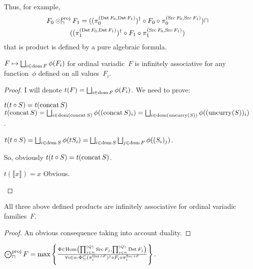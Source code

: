 \begin{rem}
  Thus, for example,
\begin{multline*}
  F_0 \odot^{\text{proj}}_{\sqcap} F_1 = ((\pi^{(\operatorname{Dst} F_0 , \operatorname{Dst}
  F_1)}_0)^{\dagger} \circ F_0 \circ \pi^{(\operatorname{Src} F_0 , \operatorname{Src}
  F_1)}_0) \sqcap\\ ((\pi^{(\operatorname{Dst} F_0 , \operatorname{Dst} F_1)}_1)^{\dagger}
  \circ F_1 \circ \pi^{(\operatorname{Src} F_0 , \operatorname{Src} F_1)}_1)
\end{multline*}
  that is product is defined by a pure algebraic formula.
\end{rem}

\begin{lem}
$F\mapsto\bigsqcup_{i\in\dom F}\phi(F_i)$ for ordinal variadic~$F$ is infinitely
associative for any function~$\phi$ defined on all values~$F_i$.
\end{lem}

\begin{proof}
I will denote $t(F)=\bigsqcup_{i\in\dom F}\phi(F_i)$. We need
to prove:
\begin{widedisorder}
\item[$t(t\circ S)=t(\operatorname{concat} S)$]
$t(\concat S)=
\bigsqcup_{i\in\dom(\concat S)}\phi((\concat S)_i)=
\bigsqcup_{i\in\dom(\uncurry(S))}\phi((\uncurry(S))_i)$.

$t(t\circ S)=
\bigsqcup_{i\in\dom S}\phi(tS_i)=
\bigsqcup_{i\in\dom S}\bigsqcup_{j\in\dom F}\phi((S_i)_j)$.

So, obviously $t(t\circ S)=t(\operatorname{concat} S)$.

\item[$t(\llbracket x\rrbracket)=x$] Obvious.
\end{widedisorder}
\end{proof}

\begin{cor}
All three above defined products are infinitely associative
for ordinal variadic families~$F$.
\end{cor}

\begin{proof}
An obvious consequence taking into account duality.
\end{proof}

\begin{prop}
  $\bigodot^{\text{proj}}_{\sqcap} F = \max \left\{ \frac{ \Phi \in \operatorname{Hom} \left( \prod^{(Q)}_{j \in
  n} \operatorname{Src} F_j , \prod^{(Q)}_{j \in n} \operatorname{Dst} F_j \right)
  }{ \forall i \in n : \Phi \sqsubseteq (\pi^{\operatorname{Dst}\circ F}_i)^{\dagger} \circ F_i \circ \pi^{\operatorname{Src}\circ F}_i }\right\}$.
\end{prop}

